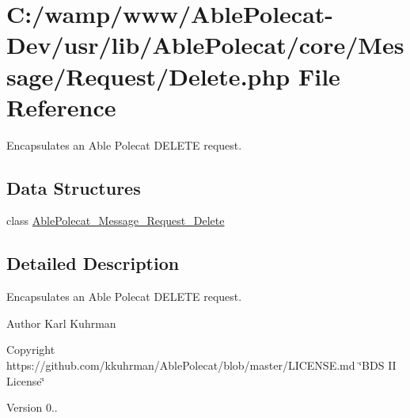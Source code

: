 \hypertarget{_delete_8php}{}\section{C\+:/wamp/www/\+Able\+Polecat-\/\+Dev/usr/lib/\+Able\+Polecat/core/\+Message/\+Request/\+Delete.php File Reference}
\label{_delete_8php}


Encapsulates an Able Polecat D\+E\+L\+E\+T\+E request.  


\subsection*{Data Structures}
\begin{DoxyCompactItemize}
\item 
class \hyperlink{class_able_polecat___message___request___delete}{Able\+Polecat\+\_\+\+Message\+\_\+\+Request\+\_\+\+Delete}
\end{DoxyCompactItemize}


\subsection{Detailed Description}
Encapsulates an Able Polecat D\+E\+L\+E\+T\+E request. 

\begin{DoxyAuthor}{Author}
Karl Kuhrman 
\end{DoxyAuthor}
\begin{DoxyCopyright}{Copyright}
https\+://github.com/kkuhrman/\+Able\+Polecat/blob/master/\+L\+I\+C\+E\+N\+S\+E.\+md \char`\"{}\+B\+D\+S I\+I License\char`\"{} 
\end{DoxyCopyright}
\begin{DoxyVersion}{Version}
0.. 
\end{DoxyVersion}
